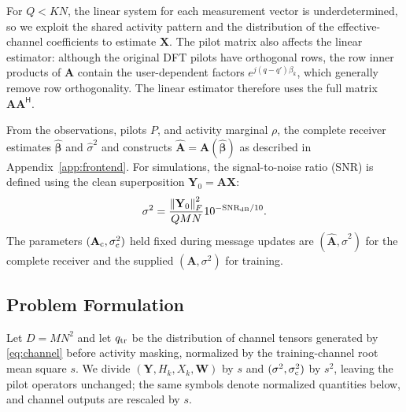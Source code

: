For $Q<KN$, the linear system for each measurement vector is
underdetermined, so we exploit the shared activity pattern and the
distribution of the effective-channel coefficients to estimate $\mathbf X$.
The pilot matrix also affects the linear estimator: although the
original DFT pilots have orthogonal rows, the row inner products of
$\mathbf A$ contain the user-dependent factors
$e^{j(q-q')\beta_k}$, which generally remove row orthogonality.
The linear estimator therefore uses the full matrix
$\mathbf A\mathbf A^{\mathsf H}$.

From the observations, pilots $P$, and activity marginal $\rho$, the
complete receiver estimates $\widehat{\bm\beta}$ and $\widehat\sigma^2$
and constructs $\widehat{\mathbf A}=\mathbf A(\widehat{\bm\beta})$
as described in Appendix~\ref{app:frontend}.
For simulations, the signal-to-noise ratio (SNR)
is defined using the clean superposition $\mathbf Y_0=\mathbf A\mathbf X$:
\begin{equation}
 \sigma^2=\frac{\left\lVert\mathbf Y_0\right\rVert_F^2}{QMN}
 10^{-\mathrm{SNR}_{\rm dB}/10}.
 \label{eq:snr}
\end{equation}
The parameters $(\mathbf A_{\rm c},\sigma_{\rm c}^2)$ held fixed during
message updates are $(\widehat{\mathbf A},\widehat\sigma^2)$ for the
complete receiver and the supplied $(\mathbf A,\sigma^2)$ for training.

\subsection{Problem Formulation}

Let $D=MN^2$ and let $q_{\rm tr}$ be the distribution of channel tensors
generated by \eqref{eq:channel} before activity masking, normalized by
the training-channel root mean square $s$.
We divide $(\mathbf Y,H_k,X_k,\mathbf W)$ by $s$ and
$(\sigma^2,\sigma_{\rm c}^2)$ by $s^2$, leaving the pilot operators
unchanged; the same symbols denote normalized quantities below, and
channel outputs are rescaled by $s$.

